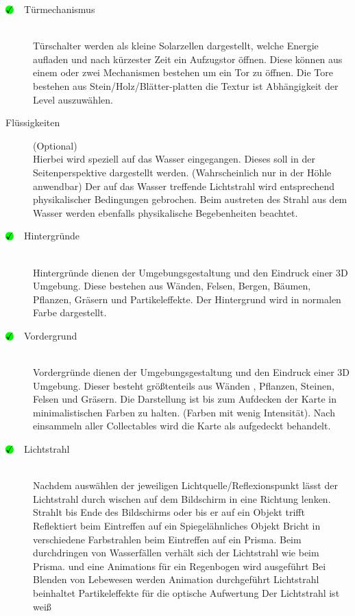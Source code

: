 \begin{description}
\item [$\circledmark\quad$Türmechanismus] \hfill \\
Türschalter werden als kleine Solarzellen dargestellt, welche Energie aufladen und nach kürzester Zeit ein Aufzugstor öffnen. Diese können aus einem oder zwei Mechanismen bestehen um ein Tor zu öffnen. Die Tore bestehen aus Stein/Holz/Blätter-platten die Textur ist Abhängigkeit der Level auszuwählen.

\item [Flüssigkeiten] (Optional) \hfill \\
Hierbei wird speziell auf das Wasser eingegangen. Dieses soll in der Seitenperspektive dargestellt werden. (Wahrscheinlich nur in der Höhle anwendbar) Der auf das Wasser treffende Lichtstrahl wird entsprechend physikalischer Bedingungen gebrochen. Beim austreten des Strahl aus dem Wasser werden ebenfalls physikalische Begebenheiten beachtet.

\item [$\circledmark\quad$Hintergründe] \hfill \\
Hintergründe dienen der Umgebungsgestaltung und den Eindruck einer 3D Umgebung. Diese bestehen aus Wänden, Felsen, Bergen, Bäumen, Pflanzen, Gräsern und Partikeleffekte. Der Hintergrund wird in normalen Farbe dargestellt.

\item [$\circledmark\quad$Vordergrund] \hfill \\
Vordergründe dienen der Umgebungsgestaltung und den Eindruck einer 3D Umgebung. Dieser besteht größtenteils aus Wänden , Pflanzen, Steinen, Felsen und Gräsern. Die Darstellung ist bis zum Aufdecken der Karte in minimalistischen Farben zu halten. (Farben mit wenig Intensität). Nach einsammeln aller Collectables wird die Karte als aufgedeckt behandelt. 

\item [$\circledmark\quad$Lichtstrahl] \hfill \\
Nachdem auswählen der jeweiligen Lichtquelle/Reflexionspunkt lässt der Lichtstrahl durch wischen auf dem Bildschirm in eine Richtung lenken.
Strahlt bis Ende des Bildschirms oder bis er auf ein Objekt trifft
Reflektiert beim Eintreffen auf ein Spiegelähnliches Objekt
Bricht in verschiedene Farbstrahlen beim Eintreffen auf ein Prisma.
Beim durchdringen von Wasserfällen verhält sich der Lichtstrahl  wie beim Prisma. und eine Animations für ein Regenbogen wird ausgeführt
Bei Blenden von Lebewesen werden Animation durchgeführt
Lichtstrahl beinhaltet Partikeleffekte für die optische Aufwertung
Der Lichtstrahl ist weiß


\end{description}
